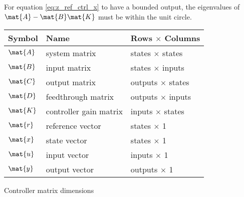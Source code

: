 For equation \eqref{eq:z_ref_ctrl_x} to have a bounded output, the eigenvalues
of $\mat{A} - \mat{B}\mat{K}$ must be within the unit circle.
\begin{booktable}
  \begin{tabular}{|lll|}
    \hline
    \rowcolor{headingbg}
    \textbf{Symbol} & \textbf{Name} & \textbf{Rows $\times$ Columns} \\
    \hline
    $\mat{A}$ & system matrix & states $\times$ states \\
    $\mat{B}$ & input matrix & states $\times$ inputs \\
    $\mat{C}$ & output matrix & outputs $\times$ states \\
    $\mat{D}$ & feedthrough matrix & outputs $\times$ inputs \\
    $\mat{K}$ & controller gain matrix & inputs $\times$ states \\
    $\mat{r}$ & \gls{reference} vector & states $\times$ 1 \\
    $\mat{x}$ & state vector & states $\times$ 1 \\
    $\mat{u}$ & input vector & inputs $\times$ 1 \\
    $\mat{y}$ & output vector & outputs $\times$ 1 \\
    \hline
  \end{tabular}
  \caption{Controller matrix dimensions}
\end{booktable}
